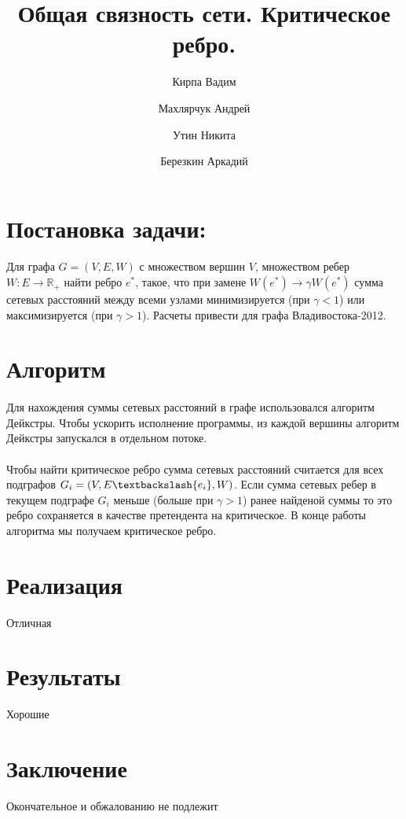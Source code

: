 \documentclass[12pt]{article}
\begin{document}
\title{Общая связность сети. Критическое ребро.}

\author{
  Кирпа Вадим
  \and
  Махлярчук Андрей
  \and
  Утин Никита
  \and
  Березкин Аркадий
}

\maketitle
\thispagestyle{empty}
\newpage

\section{Постановка задачи:}

\paragraph{}
Для графа $G = (V, E, W)$ с множеством вершин $V$,
множеством ребер $W: E \rightarrow \mathbb{R}_+$
найти ребро $e^*$, такое, что при замене
$W(e^*) \rightarrow \gamma W(e^*)$ сумма сетевых
расстояний между всеми узлами минимизируется
(при $\gamma < 1$) или максимизируется (при $\gamma > 1$).
Расчеты привести для графа Владивостока-2012.

\section{Алгоритм}

\paragraph{}
Для нахождения суммы сетевых расстояний в графе использовался
алгоритм Дейкстры. Чтобы ускорить исполнение программы, из каждой
вершины алгоритм Дейкстры запускался в отдельном потоке.

\paragraph{}
Чтобы найти критическое ребро сумма сетевых расстояний считается
для всех подграфов $G_i = (V, E\textbackslash \{e_i \}, W)$. Если сумма сетевых
ребер в текущем подграфе $G_i$ меньше (больше при $\gamma > 1$)
ранее найденой суммы то это ребро сохраняется в качестве претендента
на критическое. В конце работы алгоритма мы получаем критическое ребро.

\section{Реализация}
Отличная

\section{Результаты}
Хорошие

\section{Заключение}
Окончательное и обжалованию не подлежит
\end{document}
